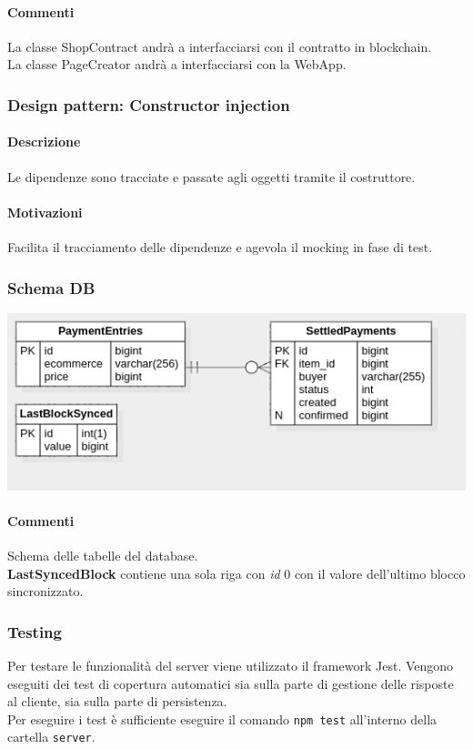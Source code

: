 \documentclass[a4paper, 12pt]{article}
\begin{document}
\paragraph{Commenti}
La classe ShopContract andrà a interfacciarsi con il contratto in blockchain.\\
La classe PageCreator andrà a interfacciarsi con la WebApp.
\subsubsection{Design pattern: Constructor injection}
\paragraph{Descrizione}
Le dipendenze sono tracciate e passate agli oggetti tramite il costruttore.
\paragraph{Motivazioni}
Facilita il tracciamento delle dipendenze e agevola il mocking in fase di test.
\subsubsection{Schema DB}
\includegraphics[width=1.0\textwidth]{db}
\paragraph{Commenti}
Schema delle tabelle del database.\\
\textbf{LastSyncedBlock} contiene una sola riga con \textit{id} 0 con il valore dell'ultimo blocco sincronizzato.
\subsubsection{Testing}
Per testare le funzionalità del server viene utilizzato il framework Jest. Vengono eseguiti dei test di copertura automatici sia sulla parte di gestione delle risposte al cliente, sia sulla parte di persistenza. \\
Per eseguire i test è sufficiente eseguire il comando \texttt{npm test} all'interno della cartella \texttt{server}.
\end{document}
